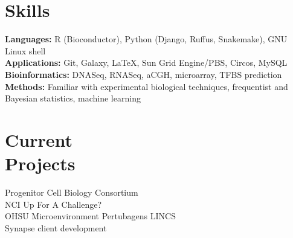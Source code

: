 \documentclass[margin,line]{res}
\begin{document}
\begin{resume}
\section{\sc Skills} 
\textbf{Languages:} R (Bioconductor), Python (Django, Ruffus, Snakemake), GNU Linux shell\\
\textbf{Applications:} Git, Galaxy, \LaTeX, Sun Grid Engine/PBS, Circos, MySQL\\
\textbf{Bioinformatics:} DNASeq, RNASeq, aCGH, microarray, TFBS prediction\\
\textbf{Methods:} Familiar with experimental biological techniques, frequentist and Bayesian statistics, machine learning

\section{\sc Current\\Projects}
Progenitor Cell Biology Consortium\\
NCI Up For A Challenge?\\
OHSU Microenvironment Pertubagens LINCS\\
Synapse client development



\end{resume}
\end{document}
